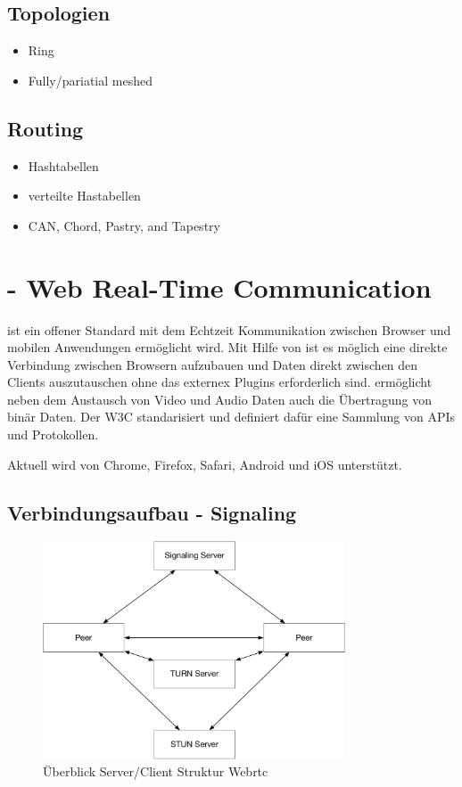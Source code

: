\subsection{Topologien}
\begin{itemize}
	\item Ring
	\item Fully/pariatial meshed
\end{itemize}
\subsection{Routing}
\begin{itemize}
	\item Hashtabellen
	\item verteilte Hastabellen
	\item CAN, Chord, Pastry, and Tapestry
\end{itemize}

\section{\webrtc - Web Real-Time Communication}

\webrtc ist ein offener Standard mit dem Echtzeit Kommunikation zwischen Browser und mobilen Anwendungen ermöglicht wird. Mit Hilfe von \webrtc ist es möglich eine direkte Verbindung zwischen Browsern aufzubauen und Daten direkt zwischen den Clients auszutauschen ohne das externex Plugins erforderlich sind. \webrtc ermöglicht neben dem Austausch von Video und Audio Daten auch die Übertragung von binär Daten.\cite{webrtc-book} Der W3C\cite{w3Webrtc} standarisiert \webrtc und definiert dafür eine Sammlung von APIs und Protokollen.

Aktuell wird \webrtc von Chrome, Firefox, Safari, Android und iOS unterstützt.\cite{caniuse-webrtc}

\subsection{Verbindungsaufbau - Signaling}

\begin{figure}[!h]
	\centering
	\includegraphics[width=0.8\textwidth]{figures/Webrtc_overview}
	\caption[A Figure Short-Title]{Überblick Server/Client Struktur Webrtc}
	\label{fig:webrtc_overview}
\end{figure}

